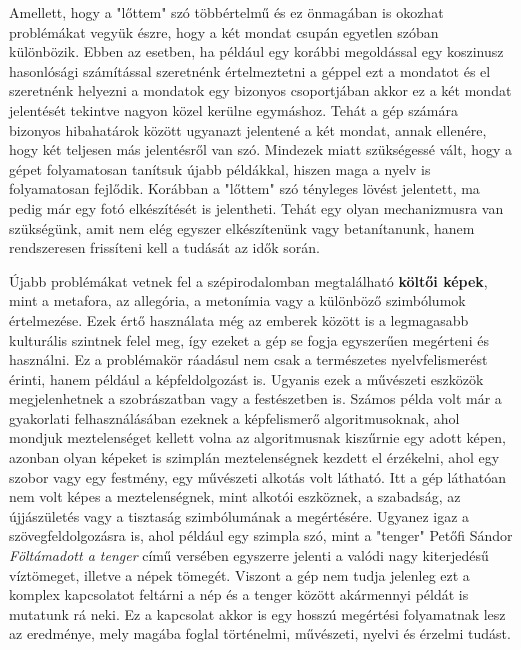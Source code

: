 Amellett, hogy a "lőttem" szó többértelmű és ez önmagában is okozhat problémákat vegyük észre, hogy a két mondat csupán egyetlen szóban különbözik. Ebben az esetben, ha például egy korábbi megoldással egy koszinusz hasonlósági számítással szeretnénk értelmeztetni a géppel ezt a mondatot és el szeretnénk helyezni a mondatok egy bizonyos csoportjában akkor ez a két mondat jelentését tekintve nagyon közel kerülne egymáshoz. Tehát a gép számára bizonyos hibahatárok között ugyanazt jelentené a két mondat, annak ellenére, hogy két teljesen más jelentésről van szó. Mindezek miatt szükségessé vált, hogy a gépet folyamatosan tanítsuk újabb példákkal, hiszen maga a nyelv is folyamatosan fejlődik. Korábban a "lőttem" szó tényleges lövést jelentett, ma pedig már egy fotó elkészítését is jelentheti. Tehát egy olyan mechanizmusra van szükségünk, amit nem elég egyszer elkészítenünk vagy betanítanunk, hanem rendszeresen frissíteni kell a tudását az idők során.

Újabb problémákat vetnek fel a szépirodalomban megtalálható \textbf{költői képek}, mint a metafora, az allegória, a metonímia vagy a különböző szimbólumok értelmezése. Ezek értő használata még az emberek között is a legmagasabb kulturális szintnek felel meg, így ezeket a gép se fogja egyszerűen megérteni és használni. Ez a problémakör ráadásul nem csak a természetes nyelvfelismerést érinti, hanem például a  képfeldolgozást is. Ugyanis ezek a művészeti eszközök megjelenhetnek a szobrászatban vagy a festészetben is. Számos példa volt már a gyakorlati felhasználásában ezeknek a képfelismerő algoritmusoknak, ahol mondjuk meztelenséget kellett volna az algoritmusnak kiszűrnie egy adott képen, azonban olyan képeket is szimplán meztelenségnek kezdett el érzékelni, ahol egy szobor vagy egy festmény, egy művészeti alkotás volt látható. Itt a gép láthatóan nem volt képes a meztelenségnek, mint alkotói eszköznek, a szabadság, az újjászületés vagy a tisztaság szimbólumának a megértésére. Ugyanez igaz a szövegfeldolgozásra is, ahol például egy szimpla szó, mint a "tenger" Petőfi Sándor \textit{Föltámadott a tenger} című versében egyszerre jelenti a valódi nagy kiterjedésű víztömeget, illetve a népek tömegét. Viszont a gép nem tudja jelenleg ezt a komplex kapcsolatot feltárni a nép és a tenger között akármennyi példát is mutatunk rá neki. Ez a kapcsolat akkor is egy hosszú megértési folyamatnak lesz az eredménye, mely magába foglal történelmi, művészeti, nyelvi és érzelmi tudást.

\newpage

